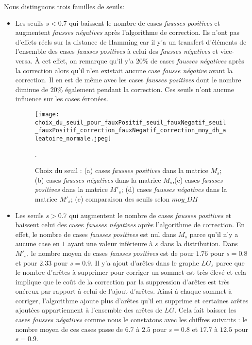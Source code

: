 Nous distinguons trois familles de seuils:
\begin{itemize}
	\item Les seuils $s < 0.7$ qui baissent le nombre de cases  {\em fausses positives} et augmentent {\em fausses n\'egatives} apr\`es l'algorithme de correction. Ils n'ont pas d'effets r\'eels sur la distance de Hamming car il y'a un transfert d'\'el\'ements de l'ensemble des cases   {\em fausses positives} \`a celui des {\em fausses n\'egatives} et vice-versa. \`A cet effet, on remarque  qu'il y'a $20\%$ de cases {\em fausses n\'egatives} apr\`es la correction alors qu'il n'en existait aucune case {\em fausse n\'egative} avant la correction. Il en est de m\^eme avec les cases  {\em fausses positives}  dont le nombre diminue de $20\%$  \'egalement pendant la correction. Ces seuils n'ont aucune influence sur les cases \'erron\'ees.
\begin{figure}[htb!] 
\centering
\texttt{[image: choix\_du\_seuil\_pour\_fauxPositif\_seuil\_fauxNegatif\_seuil\_fauxPositif\_correction\_fauxNegatif\_correction\_moy\_dh\_aleatoire\_normale.jpeg]}
\caption{ Choix du seuil : (a) cases {\em fausses positives} dans la matrice $M_s$; (b) cases {\em fausses n\'egatives} dans la matrice $M_s$,(c) cases {\em fausses positives} dans la matrice $M'_s$; (d) cases {\em fausses n\'egatives} dans la matrice $M'_s$; (e) comparaison des seuils selon $moy\_DH$ }.
\label{graphiquesFctCoutNormale} 
\end{figure}
\FloatBarrier

	\item Les seuils $s > 0.7$ qui augmentent le nombre de cases {\em fausses positives} et baissent celui des cases {\em fausses n\'egatives} apr\`es l'algorithme de correction. En effet, 
	le nombre de cases {\em fausses positives} est nul dans $M_s$ parce qu'il n'y a aucune case en $1$ ayant une valeur inf\'erieure \`a $s$ dans la distribution.
	Dans $M'_s$, le nombre moyen de cases {\em fausses positives} est de pour $1.76$ pour $s=0.8$ et pour $2.33$ pour $s=0.9$. Il y'a ajout d'ar\^etes dans le graphe $LG_s$ parce que le nombre d'ar\^etes \`a supprimer pour corriger un sommet est tr\`es \'elev\'e et cela implique que le co\^ut de la correction par la suppression d'ar\^etes est tr\`es on\'ereux par rapport \`a celui de l'ajout d'ar\^etes. Ainsi \`a chaque sommet \`a corriger, l'algorithme ajoute plus d'ar\^etes qu'il en supprime et certaines ar\^etes ajout\'ees appartiennent \`a l'ensemble des ar\^etes de $LG$. Cela fait baisser les cases {\em fausses n\'egatives} comme nous le constatons avec les chiffres suivants : le nombre moyen de ces cases passe de  $6.7$ \`a $2.5$  pour $s = 0.8$ et $17.7$ \`a $12.5$ pour $s = 0.9$.
	

\end{itemize}
